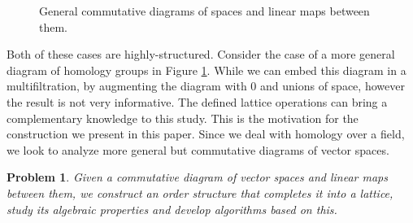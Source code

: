 \documentclass[10pt]{amsart}
\newtheorem{problem}[theorem]{Problem}
\newcommand{\X}{\mathbb{X}}
\begin{document}
\begin{figure}

\begin{center}
\end{center}

\caption{General commutative diagrams of spaces and linear maps between them.}
\label{gendigm}
\end{figure}

Both of these cases are highly-structured. 
Consider the case of a more general diagram of homology groups in Figure \ref{gendigm}.
%
While we can embed this diagram in a multifiltration, by
augmenting the diagram with $0$ and unions of space, however the result is not very informative.
The defined lattice operations can bring a complementary knowledge to this study.
%
This is the motivation for the construction we present in this
paper. Since we deal with homology over a field, we look to analyze more
general but commutative diagrams of vector spaces. 

\begin{problem}
Given a commutative diagram of vector spaces and linear maps between
them, we  construct an order structure that completes it into a lattice, study its 
algebraic properties and develop algorithms based on this.  

\begin{center}
\end{center}

\end{problem}
\end{document}
